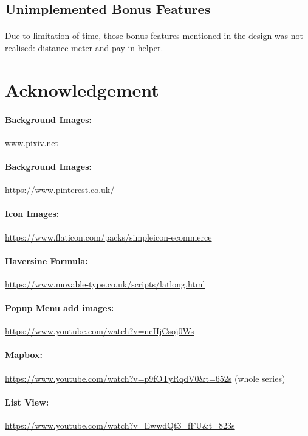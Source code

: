 \documentclass[12pt]{article}
\begin{document}
\subsection{Unimplemented Bonus Features}
\paragraph{}
Due to limitation of time, those bonus features mentioned in the design was not realised: distance meter and pay-in helper.

%
%
\section{Acknowledgement}
\paragraph{Background Images:}
\href{www.pixiv.net}{www.pixiv.net}
\paragraph{Background Images:}
\href{https://www.pinterest.co.uk/}{https://www.pinterest.co.uk/}
\paragraph{Icon Images:} \href{https://www.flaticon.com/packs/simpleicon-ecommerce}{https://www.flaticon.com/packs/simpleicon-ecommerce}
\paragraph{Haversine Formula:}
\href{https://www.movable-type.co.uk/scripts/latlong.html}{https://www.movable-type.co.uk/scripts/latlong.html}
\paragraph{Popup Menu add images:}
\href{https://www.youtube.com/watch?v=ncHjCsoj0Ws}{https://www.youtube.com/watch?v=ncHjCsoj0Ws}
\paragraph{Mapbox:}
\href{https://www.youtube.com/watch?v=p9fOTyRqdV0\&t=652s}{https://www.youtube.com/watch?v=p9fOTyRqdV0\&t=652s} (whole series)
\paragraph{List View:}
\href{https://www.youtube.com/watch?v=EwwdQt3\_fFU\&t=823s}{https://www.youtube.com/watch?v=EwwdQt3\_fFU\&t=823s}
	
\end{document}
